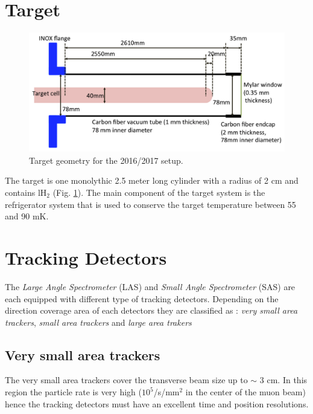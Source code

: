 \section{Target}

\begin{figure}[!h]
  \centering
	\includegraphics[scale=0.3]{./gfx/Target.png}
	\caption{Target geometry for the 2016/2017 setup.}
	\label{pic:Target}
\end{figure}

The target is one monolythic 2.5 meter long cylinder with a radius of 2 cm and contains lH$_2$ (Fig. \ref{pic:Target}). The main component of the target system is the refrigerator system that is used to conserve the target temperature between 55 and 90 mK.


\section{Tracking Detectors}\label{sec:track}

The \textit{Large Angle Spectrometer} (LAS) and \textit{Small Angle Spectrometer} (SAS) are each equipped with different type of tracking detectors. Depending on the direction coverage area of each detectors they are classified as :
\textit{very small area trackers}, \textit{small area trackers} and \textit{large area trakers}

\subsection{Very small area trackers}

The very small area trackers cover the transverse beam size up to $\sim$ 3 cm. In this region the particle rate is very
high ($10^5$/s/mm$^2$ in the center of the muon beam) hence the tracking detectors must have an excellent time and position
resolutions.

